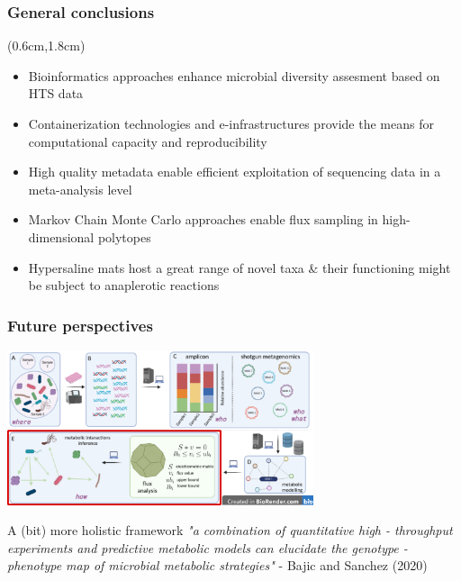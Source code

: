 \documentclass{beamer}
\begin{document}
   \begin{darkframes}

   \begin{frame}
      \frametitle{\textbf{General conclusions}}
      \begin{singlespace}
      \begin{textblock*}{11cm}(0.6cm,1.8cm)
      \small 
      \begin{itemize}
      
         \item Bioinformatics approaches enhance microbial diversity assesment based on HTS data
         \bigskip
         \item Containerization technologies and e-infrastructures provide the means for computational capacity and reproducibility
         \bigskip
         \item High quality metadata enable efficient exploitation of sequencing data in a meta-analysis level
         \bigskip
         \item Markov Chain Monte Carlo approaches enable flux sampling in high-dimensional polytopes 
         \bigskip
         \item Hypersaline mats host a great range of novel taxa \& their functioning might be subject to anaplerotic reactions
      \end{itemize}
      \end{textblock*}
   \end{singlespace}
   \end{frame}

   \begin{frame}
      \frametitle{\textbf{Future perspectives}}

      \includegraphics[width=90mm]{resources/reverse_ecology_transp_future.png}

      \begin{block}{A (bit) more holistic framework}
         \small
         \textit{
            "a combination of quantitative high - throughput experiments and predictive metabolic
            models can elucidate the genotype - phenotype map of microbial metabolic strategies"
         } - Bajic and Sanchez (2020)         %
         
      \end{block}

   \end{frame}
   \end{darkframes}
\end{document}

